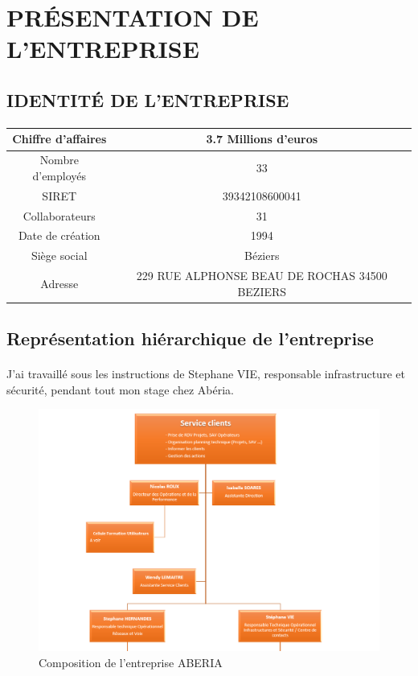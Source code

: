 \documentclass[a4paper,12pt]{report}
\begin{document}
\section{PRÉSENTATION DE L’ENTREPRISE }
\subsection{IDENTITÉ DE L’ENTREPRISE}
\paragraph*{}

\begin{tabular}{|c|c|}
\hline
Chiffre d’affaires  & 3.7 Millions d’euros \\
\hline
Nombre d’employés & 33 \\
\hline
SIRET & 39342108600041\\
\hline
Collaborateurs  & 31 \\
\hline
Date de création & 1994\\
\hline
Siège social & Béziers\\
\hline
Adresse &229 RUE ALPHONSE BEAU DE ROCHAS 34500 BEZIERS \\
\hline
\end{tabular}
\subsection{Représentation hiérarchique de l’entreprise}
\paragraph*{}

     J’ai travaillé sous les instructions de Stephane VIE, responsable infrastructure et sécurité,  pendant tout mon stage chez Abéria.
\begin{figure}[!h]
\begin{center}
\includegraphics[width=20cm]{image/hierarchi.png}
\end{center}
\caption{Composition de l'entreprise ABERIA}
\label{Photo d'illustration}
\end{figure}
\end{document}

